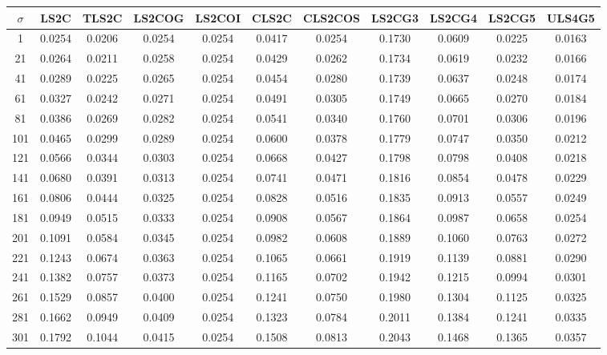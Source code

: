 \begin{table}[ht!]
\centering
\begin{tabular}{c|c|c|c|c|c|c|c|c|c|c}
$\sigma$ & \scriptsize{LS2C} & \scriptsize{TLS2C} & \scriptsize{LS2COG} & \scriptsize{LS2COI} & \scriptsize{CLS2C} & \scriptsize{CLS2COS} & \scriptsize{LS2CG3} & \scriptsize{LS2CG4} & \scriptsize{LS2CG5} & \scriptsize{ULS4G5}\\ \hline 
1 & 0.0254 & 0.0206 & 0.0254 & 0.0254 & 0.0417 & 0.0254 & 0.1730 & 0.0609 & 0.0225 & 0.0163 \\ \hline
21 & 0.0264 & 0.0211 & 0.0258 & 0.0254 & 0.0429 & 0.0262 & 0.1734 & 0.0619 & 0.0232 & 0.0166 \\ \hline
41 & 0.0289 & 0.0225 & 0.0265 & 0.0254 & 0.0454 & 0.0280 & 0.1739 & 0.0637 & 0.0248 & 0.0174 \\ \hline
61 & 0.0327 & 0.0242 & 0.0271 & 0.0254 & 0.0491 & 0.0305 & 0.1749 & 0.0665 & 0.0270 & 0.0184 \\ \hline
81 & 0.0386 & 0.0269 & 0.0282 & 0.0254 & 0.0541 & 0.0340 & 0.1760 & 0.0701 & 0.0306 & 0.0196 \\ \hline
101 & 0.0465 & 0.0299 & 0.0289 & 0.0254 & 0.0600 & 0.0378 & 0.1779 & 0.0747 & 0.0350 & 0.0212 \\ \hline
121 & 0.0566 & 0.0344 & 0.0303 & 0.0254 & 0.0668 & 0.0427 & 0.1798 & 0.0798 & 0.0408 & 0.0218 \\ \hline
141 & 0.0680 & 0.0391 & 0.0313 & 0.0254 & 0.0741 & 0.0471 & 0.1816 & 0.0854 & 0.0478 & 0.0229 \\ \hline
161 & 0.0806 & 0.0444 & 0.0325 & 0.0254 & 0.0828 & 0.0516 & 0.1835 & 0.0913 & 0.0557 & 0.0249 \\ \hline
181 & 0.0949 & 0.0515 & 0.0333 & 0.0254 & 0.0908 & 0.0567 & 0.1864 & 0.0987 & 0.0658 & 0.0254 \\ \hline
201 & 0.1091 & 0.0584 & 0.0345 & 0.0254 & 0.0982 & 0.0608 & 0.1889 & 0.1060 & 0.0763 & 0.0272 \\ \hline
221 & 0.1243 & 0.0674 & 0.0363 & 0.0254 & 0.1065 & 0.0661 & 0.1919 & 0.1139 & 0.0881 & 0.0290 \\ \hline
241 & 0.1382 & 0.0757 & 0.0373 & 0.0254 & 0.1165 & 0.0702 & 0.1942 & 0.1215 & 0.0994 & 0.0301 \\ \hline
261 & 0.1529 & 0.0857 & 0.0400 & 0.0254 & 0.1241 & 0.0750 & 0.1980 & 0.1304 & 0.1125 & 0.0325 \\ \hline
281 & 0.1662 & 0.0949 & 0.0409 & 0.0254 & 0.1323 & 0.0784 & 0.2011 & 0.1384 & 0.1241 & 0.0335 \\ \hline
301 & 0.1792 & 0.1044 & 0.0415 & 0.0254 & 0.1508 & 0.0813 & 0.2043 & 0.1468 & 0.1365 & 0.0357 \\ \hline

\end{tabular}
\end{table}
